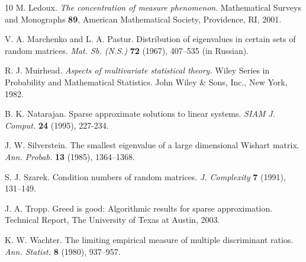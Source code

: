 \documentclass[11pt]{article}
\newcommand{\<}{\langle}
\renewcommand{\>}{\rangle}
\numberwithin{equation}{section}
\begin{document}
\begin{thebibliography}{10}
 M. Ledoux. {\em The concentration of measure
    phenomenon}. Mathematical Surveys and Monographs \textbf{89},
  American Mathematical Society, Providence, RI, 2001.
 
 V. A. Marchenko and L. A. Pastur.
  Distribution of eigenvalues in certain sets of random matrices. {\em
    Mat. Sb. (N.S.)} {\bf 72} (1967), 407--535 (in Russian).
  
 R. J. Muirhead.  {\em Aspects of multivariate
    statistical theory.}  Wiley Series in Probability and Mathematical
  Statistics. John Wiley \& Sons, Inc., New York, 1982.

 B. K. Natarajan. Sparse approximate solutions to
  linear systems. {\em SIAM J. Comput.} {\bf 24} (1995), 227-234.
    
 J. W. Silverstein. The smallest eigenvalue of a
  large dimensional Wishart matrix. {\em Ann. Probab.} {\bf 13}
  (1985), 1364--1368.
  
 S. J. Szarek. Condition numbers of random matrices.
  {\em J. Complexity} {\bf 7} (1991), 131--149.
  
 J. A. Tropp. Greed is good: {A}lgorithmic results
  for sparse approximation. Technical Report, The University of Texas
  at Austin, 2003.
  
 K. W. Wachter. The limiting empirical measure of
  multiple discriminant ratios.  {\em Ann. Statist.}  {\bf 8} (1980),
  937--957.
\end{thebibliography}
\end{document}
